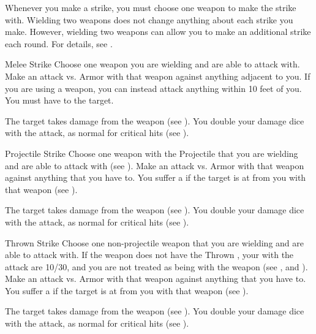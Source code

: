         Whenever you make a strike, you must choose one weapon to make the strike with.
        Wielding two weapons does not change anything about each strike you make.
        However, wielding two weapons can allow you to make an additional strike each round.
        For details, see .

        \begin{activeability}{Melee Strike}
            \label{Melee Strike}
            \rankline
            Choose one weapon you are wielding and are able to attack with.
            Make an attack vs. Armor with that weapon against anything adjacent to you.
            If you are using a  weapon, you can instead attack anything within 10 feet of you.
            You must have  to the target.

            \hit The target takes damage from the weapon (see ).
            \crit You double your damage dice with the attack, as normal for critical hits (see ).
        \end{activeability}

        \begin{activeability}{Projectile Strike}
            \label{Projectile Strike}
            \rankline
            Choose one weapon with the Projectile  that you are wielding and are able to attack with (see ).
            Make an attack vs. Armor with that weapon against anything that you have  to.
            You suffer a  if the target is at  from you with that weapon (see ).

            \hit The target takes damage from the weapon (see ).
            \crit You double your damage dice with the attack, as normal for critical hits (see ).
        \end{activeability}

        \begin{activeability}{Thrown Strike}
            \label{Thrown Strike}
            \rankline
            Choose one non-projectile weapon that you are wielding and are able to attack with.
            If the weapon does not have the Thrown , your  with the attack are 10/30, and you are not treated as being  with the weapon (see , and ).
            Make an attack vs. Armor with that weapon against anything that you have  to.
            You suffer a  if the target is at  from you with that weapon (see ).

            \hit The target takes damage from the weapon (see ).
            \crit You double your damage dice with the attack, as normal for critical hits (see ).
        \end{activeability}

